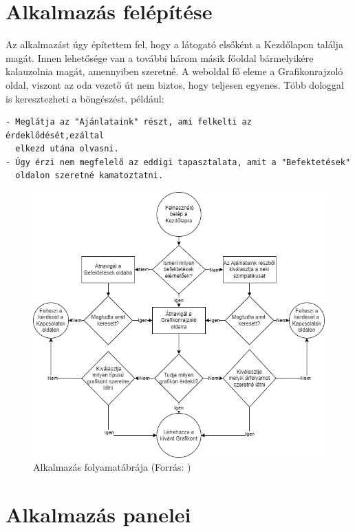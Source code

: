 
\section{Alkalmazás felépítése}

Az alkalmazást úgy építettem fel, hogy a látogató elsőként a Kezdőlapon találja magát. Innen lehetősége van a további három másik főoldal bármelyikére kalauzolnia magát, amennyiben szeretné. A weboldal fő eleme a Grafikonrajzoló oldal, viszont az oda vezető út nem biztos, hogy teljesen egyenes. Több dologgal is keresztezheti a böngészést, például:

\begin{verbatim}
- Meglátja az "Ajánlataink" részt, ami felkelti az érdeklődését,ezáltal 
  elkezd utána olvasni.
- Úgy érzi nem megfelelő az eddigi tapasztalata, amit a "Befektetések" 
  oldalon szeretné kamatoztatni.
\end{verbatim}

\begin{figure}[h]
\centering
\includegraphics[scale=0.5]{images/flowchart.png}
\caption{Alkalmazás folyamatábrája (Forrás: \cite{draw})}
\label{fig:draw}
\end{figure}

\section{Alkalmazás panelei}

